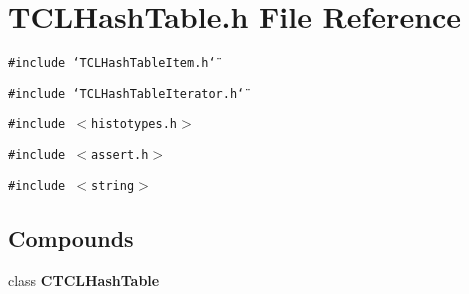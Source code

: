 \section{TCLHash\-Table.h File Reference}
\label{TCLHashTable_8h}
{\tt \#include \char`\"{}TCLHash\-Table\-Item.h\char`\"{}}\par
{\tt \#include \char`\"{}TCLHash\-Table\-Iterator.h\char`\"{}}\par
{\tt \#include $<$histotypes.h$>$}\par
{\tt \#include $<$assert.h$>$}\par
{\tt \#include $<$string$>$}\par
\subsection*{Compounds}
\begin{CompactItemize}
\item 
class {\bf CTCLHash\-Table}
\end{CompactItemize}
